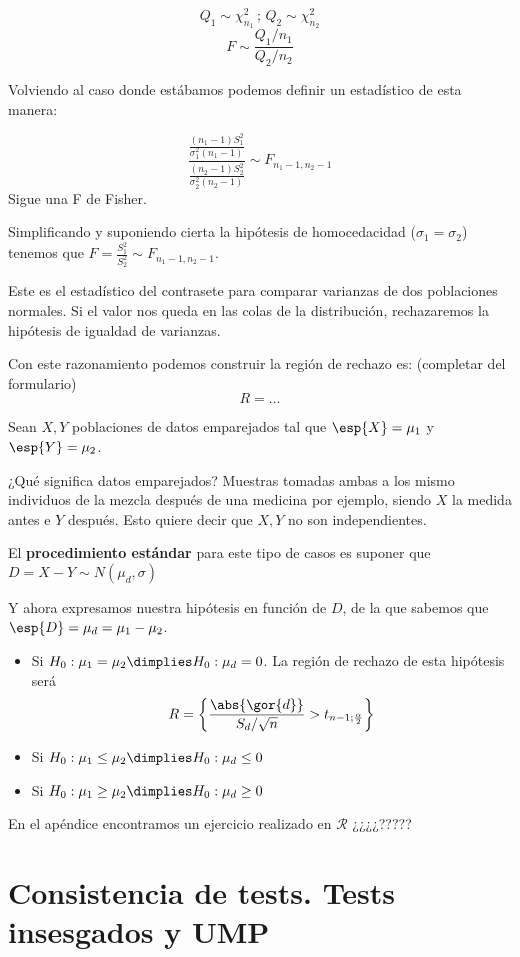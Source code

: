 \documentclass{apuntes}
\begin{document}
\[Q_1 \sim \chi_{n_1}^2 \,;\, Q_2 \sim \chi_{n_2}^2\]
\[F \sim\displaystyle \frac{\displaystyle Q_1/n_1}{\displaystyle Q_2/n_2}\]

Volviendo al caso donde estábamos podemos definir un estadístico de esta manera:

\[\frac{\frac{(n_1-1)S_1^2}{\sigma_1^2(n_1-1)}}{\frac{(n_2-1)S_2^2}{\sigma_2^2 (n_2-1)}} \sim F_{n_1-1,n_2-1}\]
Sigue una F de Fisher.

Simplificando y suponiendo cierta la hipótesis de homocedacidad ($\sigma_1 = \sigma_2$) tenemos que $F = \displaystyle \frac{S_1^2}{S_2^2} \sim F_{n_1-1,n_2-1}$. 

Este es el estadístico del contrasete para comparar varianzas de dos poblaciones normales. Si el valor nos queda en las colas de la distribución, rechazaremos la hipótesis de igualdad de varianzas.

Con este razonamiento podemos construir la región de rechazo es: 
(completar del formulario)
\[R = ...\]

\begin{example}
Sean $X,Y$ poblaciones de datos emparejados  tal que $\esp{X} = \mu_1$ y $\esp{Y} = \mu_2$.


¿Qué significa datos emparejados? Muestras tomadas ambas a los mismo individuos de la mezcla después de una medicina por ejemplo, siendo $X$ la medida antes e $Y$ después. Esto quiere decir que $X,Y$ no son independientes.

El \textbf{procedimiento estándar} para este tipo de casos es suponer que $D =X-Y \sim N(\mu_d,\sigma)$

Y ahora expresamos nuestra hipótesis en función de $D$, de la que sabemos que $\esp{D} = \mu_d = \mu_1-\mu_2$.

\begin{itemize}
\item Si $H_0: \mu_1=\mu_2 \dimplies H_0: \mu_d=0 $. La región de rechazo de esta hipótesis será \[R = \left\{\frac{\abs{\gor{d}}}{S_d / \sqrt{n}} > t_{n-1;\frac{\alpha}{2}}\right\}\]
\item Si $H_0: \mu_1\leq\mu_2 \dimplies H_0: \mu_d\leq0 $
\item Si $H_0: \mu_1\geq\mu_2 \dimplies H_0: \mu_d\geq0 $
\end{itemize}
\end{example}
En el apéndice encontramos un ejercicio realizado en $\mathcal{R}$ ¿¿¿¿?????

\section{Consistencia de tests. Tests insesgados y UMP}
\end{document}
